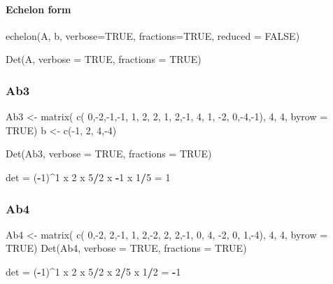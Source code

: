 \documentclass[
]{article}
\newenvironment{Shaded}{\begin{snugshade}}{\end{snugshade}}
\newcommand{\DecValTok}[1]{\textcolor[rgb]{0.00,0.00,0.81}{#1}}
\newcommand{\NormalTok}[1]{#1}
\newcommand{\OtherTok}[1]{\textcolor[rgb]{0.56,0.35,0.01}{#1}}
\newcommand{\SpecialCharTok}[1]{\textcolor[rgb]{0.81,0.36,0.00}{\textbf{#1}}}
\begin{document}
\paragraph{Echelon form}\label{echelon-form}

echelon(A, b, verbose=TRUE, fractions=TRUE, reduced = FALSE)

Det(A, verbose = TRUE, fractions = TRUE)

\begin{Shaded}
\begin{Highlighting}[]

\end{Highlighting}
\end{Shaded}

\subsubsection{Ab3}\label{ab3}

Ab3 \textless- matrix( c( 0,-2,-1,-1, 1, 2, 2, 1, 2,-1, 4, 1, -2,
0,-4,-1), 4, 4, byrow = TRUE) b \textless- c(-1, 2, 4,-4)

Det(Ab3, verbose = TRUE, fractions = TRUE)

\begin{Shaded}
\begin{Highlighting}[]
\NormalTok{det }\OtherTok{=}\NormalTok{ (}\SpecialCharTok{{-}}\DecValTok{1}\NormalTok{)}\SpecialCharTok{\^{}}\DecValTok{1}\NormalTok{ x }\DecValTok{2}\NormalTok{ x }\DecValTok{5}\SpecialCharTok{/}\DecValTok{2}\NormalTok{ x }\SpecialCharTok{{-}}\DecValTok{1}\NormalTok{ x }\DecValTok{1}\SpecialCharTok{/}\DecValTok{5} \OtherTok{=} \DecValTok{1}
\end{Highlighting}
\end{Shaded}

\subsubsection{Ab4}\label{ab4}

Ab4 \textless- matrix( c( 0,-2, 2,-1, 1, 2,-2, 2, 2,-1, 0, 4, -2, 0,
1,-4), 4, 4, byrow = TRUE) Det(Ab4, verbose = TRUE, fractions = TRUE)

\begin{Shaded}
\begin{Highlighting}[]
\NormalTok{det }\OtherTok{=}\NormalTok{ (}\SpecialCharTok{{-}}\DecValTok{1}\NormalTok{)}\SpecialCharTok{\^{}}\DecValTok{1}\NormalTok{ x }\DecValTok{2}\NormalTok{ x }\DecValTok{5}\SpecialCharTok{/}\DecValTok{2}\NormalTok{ x }\DecValTok{2}\SpecialCharTok{/}\DecValTok{5}\NormalTok{ x }\DecValTok{1}\SpecialCharTok{/}\DecValTok{2} \OtherTok{=} \SpecialCharTok{{-}}\DecValTok{1}
\end{Highlighting}
\end{Shaded}
\end{document}
